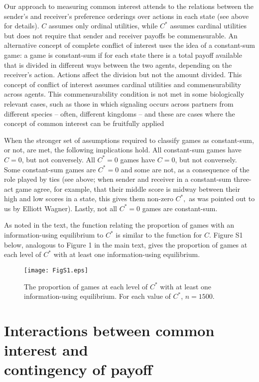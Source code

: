\documentclass{article}
\begin{document}
Our approach to measuring common interest attends to the relations
between the sender's and receiver's preference orderings over actions
in each state (see above for details). $C$
assumes only ordinal utilities, while $C^*$ assumes cardinal utilities but
does not require that sender and receiver payoffs be commensurable.
An alternative concept of complete conflict of interest uses the idea of
a constant-sum game: a game is constant-sum if for each state there is
 a total payoff available that is divided in different ways between the
two agents, depending on the receiver's action. Actions affect
the division but not the amount divided. This concept of conflict of
interest assumes cardinal utilities and commensurability across
agents. This commensurability condition is not met in some
biologically relevant cases, such as those in which signaling occurs
across partners from different species -- often, different
kingdoms -- and these are cases where the concept of common interest
can be fruitfully applied \citep{Bergstrom2001, FitzGibbon1988, Harrison2005}

When the stronger set of assumptions required to classify
games as constant-sum, or not, are met, the following implications
hold. All constant-sum games have $C=0$, but not conversely. All $C^*=0$
games have $C=0$, but not conversely. Some constant-sum games are
$C^*=0$ and some are not, as a consequence of the role played by ties
(see above; when sender and receiver in a constant-sum three-act
game agree, for example, that their middle score is midway between
their high and low scores in a state, this gives them non-zero $C^*,$ as
was pointed out to us by Elliott Wagner). Lastly, not all $C^*=0$ games
are constant-sum.

As noted in the text, the function relating the proportion of
games with an information-using equilibrium to $C^*$ is similar to the
function for $C$. Figure S1 below, analogous to Figure 1 in the main text,
gives the proportion of games at each level of $C^*$ with at least one
 information-using equilibrium.

\begin{figure}[!ht]
\begin{center}
    \texttt{[image: FigS1.eps]}
\end{center}
\caption{The proportion of games at each level of $C^*$ with
at least one information-using equilibrium. For each value of $C^*$,
$n=1500$.}
\label{Figure_label}
\end{figure}

\section*{Interactions between common interest and \\contingency of
payoff}
\end{document}
